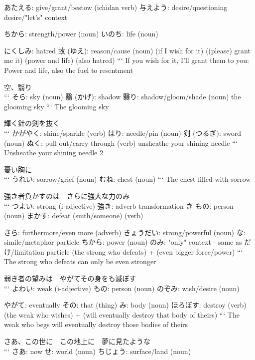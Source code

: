           あたえる: give/grant/bestow (ichidan verb)
          与えよう: desire/questioning desire/"let's" context

                    ちから: strength/power (noun)
                    いのち: life (noun)

                              にくしみ: hatred
                              故 (ゆえ): reason/cause (noun)
(if I wish for it) ((please) grant me it) (power and life) (also hatred)
```
If you wish for it, I'll grant them to you: Power and life, also the fuel to resentment

空、翳り \\
```
そら: sky (noun)
翳 (かげ): shadow
翳り: shadow/gloom/shade (noun)
the glooming sky
```
The glooming sky

輝く針の剣を抜く \\
```
かがやく: shine/sparkle (verb)
はり: needle/pin (noun)
剣 (つるぎ): sword (noun)
ぬく: pull out/carry through (verb)
unsheathe your shining needle
```
Unsheathe your shining needle {2}

憂い胸に \\
```
うれい: sorrow/grief (noun)
むね: chest (noun)
```
The chest filled with sorrow

強き者負かすのは　さらに強大な力のみ \\
```
つよい: strong (i-adjective)
強き: adverb transformation き
もの: person (noun)
まかす: defeat (smth/someone) (verb)

                さら: furthermore/even more (adverb)
                    きょうだい: strong/powerful (noun)
                    な: simile/metaphor particle
                    ちから: power (noun)
                    のみ: "only" context - same as だけ/limitation particle
(the strong who defeats) + (even bigger force/power)
```
The strong who defeats can only be even stronger

弱き者の望みは　やがてその身をも滅ぼす \\
```
よわい: weak (i-adjective)
もの: person (noun)
のぞみ: wish/desire (noun)

                やがて: eventually
                その: that (thing)
                み: body (noun)
                ほろぼす: destroy (verb)
(the weak who wishes) + (will eventually destroy that body of theirs)
```
The weak who begs will eventually destroy those bodies of theirs

さあ、この世に　この地上に　夢に見たような \\
```
さあ: now
          せ: world (noun)
                  ちじょう: surface/land (noun)

